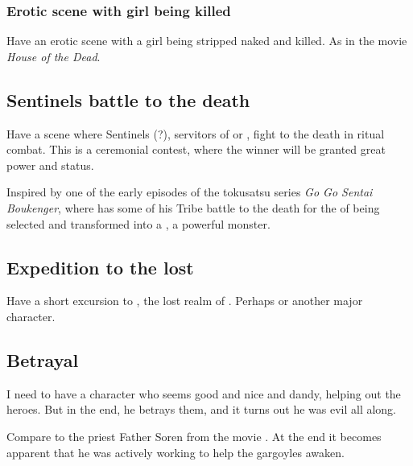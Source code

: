 \subsubsection{Erotic scene with girl being killed}
Have an erotic scene with a girl being stripped naked and killed. As in the movie \emph{House of the Dead}. 










\subsection{Sentinels battle to the death}
Have a scene where Sentinels (\rachyth?), servitors of \Secherdamon{} or \Vizsherioch, fight to the death in ritual combat. This is a ceremonial contest, where the winner will be granted great power and status. 

Inspired by one of the early episodes of the tokusatsu series \emph{Go Go Sentai Boukenger}, where \Ryuuoun{} has some of his \Jaryuu{} Tribe battle to the death for the \honour of being selected and transformed into a \Daijakuryuu, a powerful monster.







\subsection{Expedition to the lost \Dragonland}
Have a short excursion to \Dragonland, the lost realm of \dragons. Perhaps \Nzessuacrith{} or another major \draconian{} character. 







\subsection{Betrayal}
I need to have a character who seems good and nice and dandy, helping out the heroes. But in the end, he betrays them, and it turns out he was evil all along. 

Compare to the priest Father Soren from the movie \cite{Movie:GargoylesRevenge}. 
At the end it becomes apparent that he was actively working to help the gargoyles awaken. 







